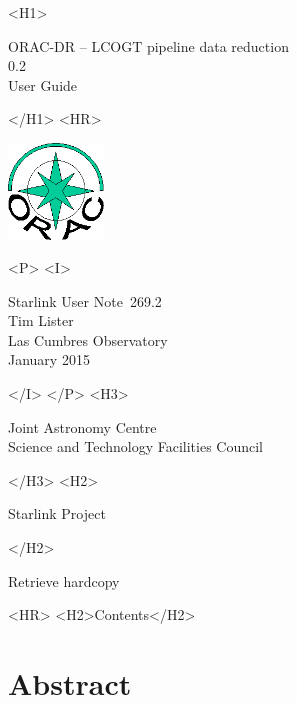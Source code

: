 \documentclass[twoside,11pt]{article}
\newcommand{\stardoccategory}  {Starlink User Note}
\newcommand{\stardocsource}    {sun\stardocnumber}
\newcommand{\stardocnumber}    {269.2}
\newcommand{\stardocauthors}   {Tim Lister \\
                                Las Cumbres Observatory}
\newcommand{\stardocdate}      {January 2015}
\newcommand{\stardoctitle}     {ORAC-DR -- LCOGT pipeline data reduction}
\newcommand{\stardocversion}   {0.2}
\newcommand{\stardocmanual}    {User Guide}
\newcommand{\htmladdnormallink}[2]{#1}
\newcommand{\htmladdimg}[1]{}
\newcommand{\htmlref}[2]{#1}
\newcommand{\htmladdtonavigation}[1]{}
\newcommand{\xlabel}[1]{}
\renewcommand{\_}{\texttt{\symbol{95}}}
\begin{document}
\begin{htmlonly}
   \xlabel{}
   \begin{rawhtml} <H1> \end{rawhtml}
      \stardoctitle\\
      \stardocversion\\
      \stardocmanual
   \begin{rawhtml} </H1> <HR> \end{rawhtml}

\includegraphics[width=1.0in]{sun260_logo}

   \begin{rawhtml} <P> <I> \end{rawhtml}
   \stardoccategory\ \stardocnumber \\
   \stardocauthors \\
   \stardocdate
   \begin{rawhtml} </I> </P> <H3> \end{rawhtml}
      \htmladdnormallink{Joint Astronomy Centre}
                        {http://www.jach.hawaii.edu/} \\
      \htmladdnormallink{Science and Technology Facilities Council}
                        {http://www.scitech.ac.uk/} \\
   \begin{rawhtml} </H3> <H2> \end{rawhtml}
      \htmladdnormallink{Starlink Project}{http://www.starlink.ac.uk/}
   \begin{rawhtml} </H2> \end{rawhtml}
   \htmladdnormallink{\htmladdimg{source.gif} Retrieve hardcopy}
      {http://www.starlink.ac.uk/cgi-bin/hcserver?\stardocsource}\\

  \label{stardoccontents}
  \begin{rawhtml}
    <HR>
    <H2>Contents</H2>
  \end{rawhtml}
  \htmladdtonavigation{\htmlref{\htmladdimg{contents_motif.gif}}
        {stardoccontents}}

  \section{\xlabel{abstract}Abstract}
\end{htmlonly}
\end{document}
